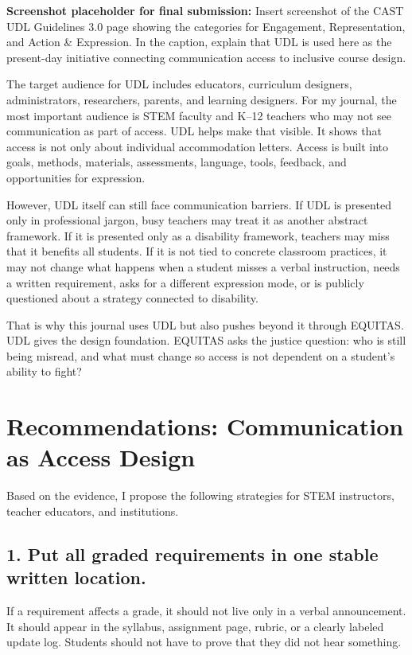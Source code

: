 \documentclass[12pt]{article}
\begin{document}
\begin{framed}
\noindent \textbf{Screenshot placeholder for final submission:} Insert screenshot of the CAST UDL Guidelines 3.0 page showing the categories for Engagement, Representation, and Action \& Expression. In the caption, explain that UDL is used here as the present-day initiative connecting communication access to inclusive course design.
\end{framed}

The target audience for UDL includes educators, curriculum designers, administrators, researchers, parents, and learning designers. For my journal, the most important audience is STEM faculty and K--12 teachers who may not see communication as part of access. UDL helps make that visible. It shows that access is not only about individual accommodation letters. Access is built into goals, methods, materials, assessments, language, tools, feedback, and opportunities for expression.

However, UDL itself can still face communication barriers. If UDL is presented only in professional jargon, busy teachers may treat it as another abstract framework. If it is presented only as a disability framework, teachers may miss that it benefits all students. If it is not tied to concrete classroom practices, it may not change what happens when a student misses a verbal instruction, needs a written requirement, asks for a different expression mode, or is publicly questioned about a strategy connected to disability.

That is why this journal uses UDL but also pushes beyond it through EQUITAS. UDL gives the design foundation. EQUITAS asks the justice question: who is still being misread, and what must change so access is not dependent on a student's ability to fight?

\section*{Recommendations: Communication as Access Design}

Based on the evidence, I propose the following strategies for STEM instructors, teacher educators, and institutions.

\subsection*{1. Put all graded requirements in one stable written location.}

If a requirement affects a grade, it should not live only in a verbal announcement. It should appear in the syllabus, assignment page, rubric, or a clearly labeled update log. Students should not have to prove that they did not hear something.
\end{document}
